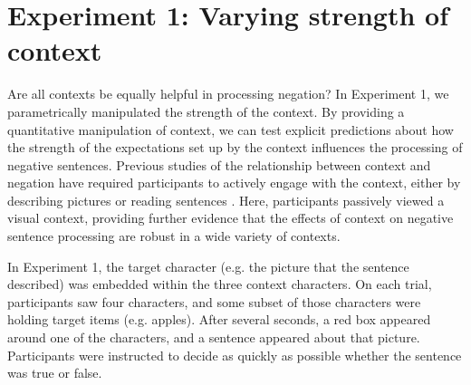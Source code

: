 \documentclass[man]{apa2}
\begin{document}
%
%

\section{Experiment 1: Varying strength of context}

Are all contexts be equally helpful in processing negation? In Experiment 1, we parametrically manipulated the strength of the context.  By providing a quantitative manipulation of context, we can test explicit predictions about how the strength of the expectations set up by the context influences the processing of negative sentences.  Previous studies of the relationship between context and negation have required participants to actively engage with the context, either by describing pictures \cite{wason1965} or reading sentences \cite{glenberg1999}.  Here, participants passively viewed a visual context, providing further evidence that the effects of context on negative sentence processing are robust in a wide variety of contexts.

In Experiment 1, the target character (e.g. the picture that the sentence described) was embedded within the three context characters.  On each trial, participants saw four characters, and some subset of those characters were holding target items (e.g. apples).  After several seconds, a red box appeared around one of the characters, and a sentence appeared about that picture.  Participants were instructed to decide as quickly as possible whether the sentence was true or false.  
\end{document}
